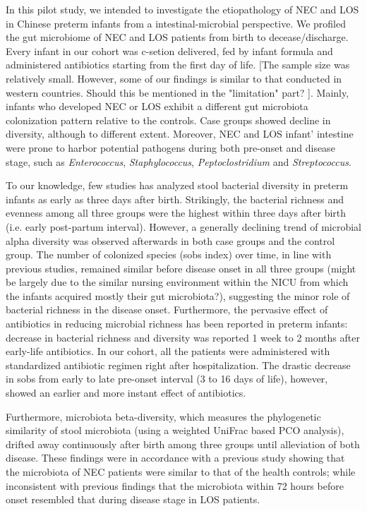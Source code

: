 \documentclass[fleqn,10pt]{wlpeerj} %
\begin{document}
In this pilot study, we intended to investigate the etiopathology of NEC and LOS in Chinese preterm infants from a intestinal-microbial perspective. We profiled the gut microbiome of NEC and LOS patients from birth to decease/discharge. Every infant in our cohort was c-setion delivered, fed by infant formula and administered antibiotics starting from the first day of life. [The sample size was relatively small.  However, some of our findings is similar to that conducted in western countries. Should this be mentioned in the "limitation" part? ].  Mainly, infants who developed NEC or LOS exhibit a different gut microbiota colonization pattern relative to the controls. Case groups showed decline in diversity, although to different extent. Moreover, NEC and LOS infant' intestine were prone to harbor potential pathogens during both pre-onset and disease stage, such as \textit{Enterococcus}, \textit{Staphylococcus}, \textit{Peptoclostridium} and \textit{Streptococcus}.

To our knowledge, few studies has analyzed stool bacterial diversity in preterm infants as early as three days after birth. Strikingly, the bacterial richness and evenness among all three groups were the highest within three days after birth (i.e. early post-partum interval). However, a generally declining trend of microbial alpha diversity was observed afterwards in both case groups and the control group. The number of colonized species (sobs index) over time, in line with previous studies\citep{mai2011fecal, mai2013distortions}, remained similar before disease onset in all three groups (might be largely due to the similar nursing environment within the NICU from which the infants acquired mostly their gut microbiota?), suggesting the minor role of bacterial richness in the disease onset. Furthermore, the pervasive effect of antibiotics in reducing microbial richness has been reported in preterm infants: decrease in bacterial richness and diversity was reported 1 week to 2 months after early-life antibiotics\citep{digiulio2008microbial, dethlefsen2011incomplete, fouhy2012high, greenwood2014early, tanaka2009influence}. In our cohort, all the patients were administered with standardized antibiotic regimen right after hospitalization. The drastic decrease in sobs from early to late pre-onset interval (3 to 16 days of life), however, showed an earlier and more instant effect of antibiotics.

Furthermore, microbiota beta-diversity, which measures the phylogenetic similarity of stool microbiota (using a weighted UniFrac based PCO analysis), drifted away continuously after birth among three groups until alleviation of both disease. These findings were in accordance with a previous study showing that the microbiota of NEC patients were similar to that of the health controls\citep{mai2011fecal}; while inconsistent with previous findings that the microbiota within 72 hours before onset resembled that during disease stage in LOS patients\citep{mai2013distortions}.
\end{document}
